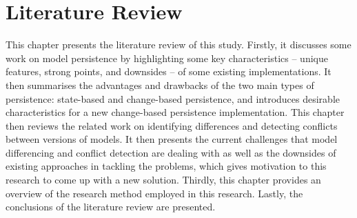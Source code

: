 \chapter{Literature Review}
\label{ch:literature_review}

This chapter presents the literature review of this study. Firstly, it discusses some work on model persistence by highlighting some key characteristics -- unique features, strong points, and downsides -- of some existing implementations. It then summarises the advantages and drawbacks of the two main types of persistence: state-based and change-based persistence, and introduces desirable characteristics for a new change-based persistence implementation. This chapter then reviews the related work on identifying differences and detecting conflicts between versions of models. It then presents the current challenges that model differencing and conflict detection are dealing with as well as the downsides of existing approaches in tackling the problems, which gives motivation to this research to come up with a new solution. Thirdly, this chapter provides an overview of the research method employed in this research. Lastly, the conclusions of the literature review are presented.  

%
%

